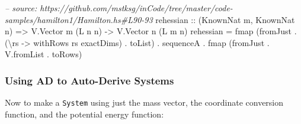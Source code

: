 \documentclass[]{article}
\newenvironment{Shaded}{}{}
\newcommand{\DataTypeTok}[1]{\textcolor[rgb]{0.56,0.13,0.00}{#1}}
\newcommand{\CommentTok}[1]{\textcolor[rgb]{0.38,0.63,0.69}{\textit{#1}}}
\newcommand{\OtherTok}[1]{\textcolor[rgb]{0.00,0.44,0.13}{#1}}
\newcommand{\FunctionTok}[1]{\textcolor[rgb]{0.02,0.16,0.49}{#1}}
\newcommand{\NormalTok}[1]{#1}
\begin{document}
\begin{Shaded}
\begin{Highlighting}[]
\CommentTok{-- source: https://github.com/mstksg/inCode/tree/master/code-samples/hamilton1/Hamilton.hs#L90-93}
\OtherTok{rehessian ::}\NormalTok{ (}\DataTypeTok{KnownNat}\NormalTok{ m, }\DataTypeTok{KnownNat}\NormalTok{ n) }\OtherTok{=>} \DataTypeTok{V.Vector}\NormalTok{ m (}\DataTypeTok{L}\NormalTok{ n n) }\OtherTok{->} \DataTypeTok{V.Vector}\NormalTok{ n (}\DataTypeTok{L}\NormalTok{ m n)}
\NormalTok{rehessian }\FunctionTok{=}\NormalTok{ fmap (fromJust }\FunctionTok{.}\NormalTok{ (\textbackslash{}rs }\OtherTok{->}\NormalTok{ withRows rs exactDims) }\FunctionTok{.}\NormalTok{ toList)}
          \FunctionTok{.}\NormalTok{ sequenceA}
          \FunctionTok{.}\NormalTok{ fmap (fromJust }\FunctionTok{.}\NormalTok{ V.fromList }\FunctionTok{.}\NormalTok{ toRows)}
\end{Highlighting}
\end{Shaded}

\subsubsection{Using AD to Auto-Derive
Systems}\label{using-ad-to-auto-derive-systems}

Now to make a \texttt{System} using just the mass vector, the coordinate
conversion function, and the potential energy function:
\end{document}
